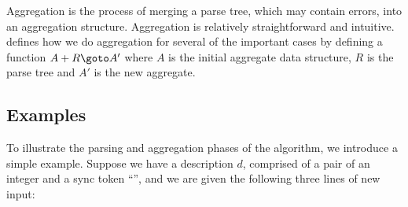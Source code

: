 





Aggregation is the process of merging a parse tree, which may contain
errors, into an aggregation structure.  Aggregation is relatively
straightforward and intuitive. 
 defines how we do aggregation
for several of the important cases by defining a function
$A + R \goto A'$ where $A$ is the initial aggregate data structure,
$R$ is the parse tree and $A'$ is the new aggregate.

\subsection{Examples}
To illustrate the parsing and aggregation phases of the algorithm, we
introduce a simple example.
Suppose we have a description $d$, comprised of a pair of an integer and a sync token ``\cd{*}'',
and we are given the following three lines of new input:

